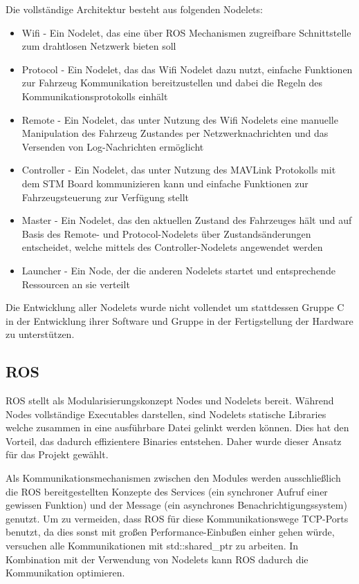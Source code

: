 \documentclass[a4paper, 12pt, titlepage]{scrartcl}
\begin{document}
			Die vollständige Architektur besteht aus folgenden Nodelets:
			\begin{itemize}
				\item Wifi - Ein Nodelet, das eine über ROS Mechanismen zugreifbare Schnittstelle zum drahtlosen Netzwerk bieten soll
				\item Protocol - Ein Nodelet, das das Wifi Nodelet dazu nutzt, einfache Funktionen zur Fahrzeug Kommunikation bereitzustellen und dabei die Regeln des Kommunikationsprotokolls einhält
				\item Remote - Ein Nodelet, das unter Nutzung des Wifi Nodelets eine manuelle Manipulation des Fahrzeug Zustandes per Netzwerknachrichten und das Versenden von Log-Nachrichten ermöglicht
				\item Controller - Ein Nodelet, das unter Nutzung des MAVLink Protokolls mit dem STM Board kommunizieren kann und einfache Funktionen zur Fahrzeugsteuerung zur Verfügung stellt
				\item Master - Ein Nodelet, das den aktuellen Zustand des Fahrzeuges hält und auf Basis des Remote- und Protocol-Nodelets über Zustandsänderungen entscheidet, welche mittels des Controller-Nodelets angewendet werden
				\item Launcher - Ein Node, der die anderen Nodelets startet und entsprechende Ressourcen an sie verteilt
			\end{itemize}
			
			Die Entwicklung aller Nodelets wurde nicht vollendet um stattdessen Gruppe C in der Entwicklung ihrer Software und Gruppe in der Fertigstellung der Hardware zu unterstützen.			
			
			\subsection{ROS}
			\label{sw_b_ros}
			
			ROS stellt als Modularisierungskonzept Nodes und Nodelets bereit. Während Nodes vollständige Executables darstellen, sind Nodelets statische Libraries welche zusammen in eine ausführbare Datei gelinkt werden können. Dies hat den Vorteil, das dadurch effizientere Binaries entstehen. Daher wurde dieser Ansatz für das Projekt gewählt.
			
			Als Kommunikationsmechanismen zwischen den Modules werden ausschließlich die ROS bereitgestellten Konzepte des Services (ein synchroner Aufruf einer gewissen Funktion) und der Message (ein asynchrones Benachrichtigungssystem) genutzt. Um zu vermeiden, dass ROS für diese Kommunikationswege TCP-Ports benutzt, da dies sonst mit großen Performance-Einbußen einher gehen würde, versuchen alle Kommunikationen mit std::shared\_ptr zu arbeiten. In Kombination mit der Verwendung von Nodelets kann ROS dadurch die Kommunikation optimieren.
			
\end{document}
